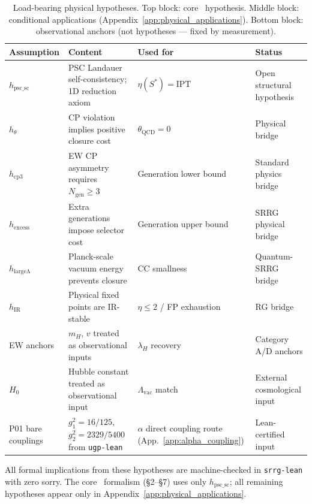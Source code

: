 \documentclass[11pt]{article}
\theoremstyle{remark}
\newcommand{\SRRG}{\text{SRRG}}
\newcommand{\IPT}{\mathrm{IPT}}
\newcommand{\lean}[1]{%
  \penalty-100
  \begingroup
  \def\_{\textunderscore\allowbreak}%
  \texttt{#1}%
  \endgroup
}
\newcommand{\Sstar}{S^*}
\begin{document}
\begin{table}[H]
\centering\small
\setlength{\tabcolsep}{4pt}
\begin{tabular}{@{}p{2.5cm}p{4.5cm}p{2.8cm}p{2.3cm}@{}}
\toprule
\textbf{Assumption} & \textbf{Content} & \textbf{Used for} & \textbf{Status} \\
\midrule
$h_{\mathrm{psc\_sc}}$ & PSC Landauer self-consistency; 1D reduction axiom & $\eta(\Sstar)=\IPT$ & Open structural hypothesis \\
\midrule
$h_{\theta}$ & CP violation implies positive closure cost & $\theta_{\mathrm{QCD}}=0$ & Physical bridge \\
$h_{\mathrm{cp3}}$ & EW CP asymmetry requires $N_{\mathrm{gen}}\ge3$ & Generation lower bound & Standard physics bridge \\
$h_{\mathrm{excess}}$ & Extra generations impose selector cost & Generation upper bound & SRRG physical bridge \\
$h_{\mathrm{large\Lambda}}$ & Planck-scale vacuum energy prevents closure & CC smallness & Quantum-SRRG bridge \\
$h_{\mathrm{IR}}$ & Physical fixed points are IR-stable & $\eta\le2$ / FP exhaustion & RG bridge \\
\midrule
EW anchors & $m_H$, $v$ treated as observational inputs & $\lambda_H$ recovery & Category A/D anchors \\
$H_0$ & Hubble constant treated as observational input & $\Lambda_{\mathrm{vac}}$ match & External cosmological input \\
P01 bare couplings & $g_1^2=16/125$, $g_2^2=2329/5400$ from \lean{ugp-lean} & $\alpha$ direct coupling route (App.~\ref{app:alpha_coupling}) & Lean-certified input \\
\bottomrule
\end{tabular}
\caption{Load-bearing physical hypotheses. Top block: core \SRRG\ hypothesis. Middle block: conditional applications (Appendix~\ref{app:physical_applications}). Bottom block: observational anchors (not hypotheses --- fixed by measurement).}
\label{tab:assumptions}
\end{table}

\noindent All formal implications from these hypotheses are machine-checked in \lean{srrg-lean} with zero sorry. The core \SRRG\ formalism (§2--§7) uses only $h_{\mathrm{psc\_sc}}$; all remaining hypotheses appear only in Appendix~\ref{app:physical_applications}.

\end{document}
